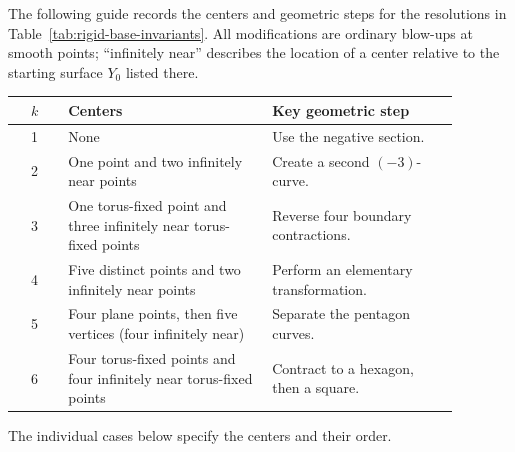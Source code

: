 \documentclass[11pt]{article}
\theoremstyle{plain}
\theoremstyle{definition}
\theoremstyle{remark}
\begin{document}
The following guide records the centers and geometric steps for the resolutions
in Table~\ref{tab:rigid-base-invariants}. All modifications are ordinary
blow-ups at smooth points; ``infinitely near'' describes the location of a
center relative to the starting surface \(Y_0\) listed there.
\begin{center}
\small
\renewcommand{\arraystretch}{1.2}
\begin{tabular}{@{}c p{0.46\linewidth} p{0.42\linewidth}@{}}
\(k\)&Centers&Key geometric step\\ \hline
1&None&Use the negative section.\\
2&One point and two infinitely near points&Create a second \((-3)\)-curve.\\
3&One torus-fixed point and three infinitely near torus-fixed points&Reverse
four boundary contractions.\\
4&Five distinct points and two infinitely near points&Perform an elementary
transformation.\\
5&Four plane points, then five vertices (four infinitely near)&Separate the
pentagon curves.\\
6&Four torus-fixed points and four infinitely near torus-fixed points&Contract to
a hexagon, then a square.
\end{tabular}
\end{center}
The individual cases below specify the centers and their order.
\end{document}
